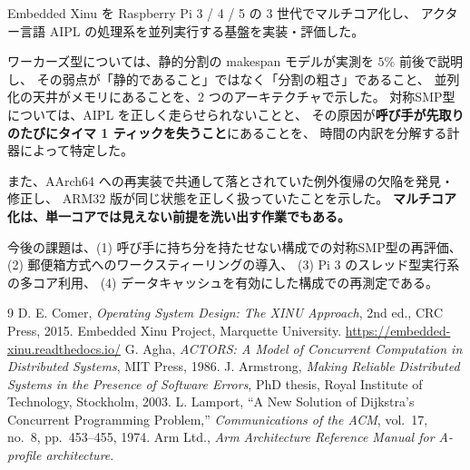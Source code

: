 \documentclass[a4paper,11pt]{ltjsarticle}
\begin{document}
Embedded Xinu を Raspberry Pi 3 / 4 / 5 の 3 世代でマルチコア化し、
アクター言語 AIPL の処理系を並列実行する基盤を実装・評価した。

ワーカーズ型については、静的分割の makespan モデルが実測を $5\%$ 前後で説明し、
その弱点が「静的であること」ではなく「分割の粗さ」であること、
並列化の天井がメモリにあることを、2 つのアーキテクチャで示した。
対称SMP型については、AIPL を正しく走らせられないことと、
その原因が\textbf{呼び手が先取りのたびにタイマ 1 ティックを失うこと}にあることを、
時間の内訳を分解する計器によって特定した。

また、AArch64 への再実装で共通して落とされていた例外復帰の欠陥を発見・修正し、
ARM32 版が同じ状態を正しく扱っていたことを示した。
\textbf{マルチコア化は、単一コアでは見えない前提を洗い出す作業でもある。}

今後の課題は、(1) 呼び手に持ち分を持たせない構成での対称SMP型の再評価、
(2) 郵便箱方式へのワークスティーリングの導入、
(3) Pi 3 のスレッド型実行系の多コア利用、
(4) データキャッシュを有効にした構成での再測定である。

\begin{thebibliography}{9}
 D. E. Comer, \textit{Operating System Design: The XINU Approach},
  2nd ed., CRC Press, 2015.
 Embedded Xinu Project, Marquette University.
  \url{https://embedded-xinu.readthedocs.io/}
 G. Agha, \textit{ACTORS: A Model of Concurrent Computation in
  Distributed Systems}, MIT Press, 1986.
 J. Armstrong, \textit{Making Reliable Distributed Systems in the
  Presence of Software Errors}, PhD thesis, Royal Institute of Technology, Stockholm, 2003.
 L. Lamport, ``A New Solution of Dijkstra's Concurrent Programming
  Problem,'' \textit{Communications of the ACM}, vol.~17, no.~8, pp.~453--455, 1974.
 Arm Ltd., \textit{Arm Architecture Reference Manual for A-profile
  architecture}.
\end{thebibliography}
\end{document}
